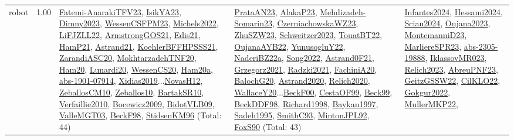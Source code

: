 {\begin{longtable}{p{3cm}r>{\raggedright\arraybackslash}p{6cm}>{\raggedright\arraybackslash}p{6cm}>{\raggedright\arraybackslash}p{8cm}}
\index{robot}\index{ApplicationAreas!robot}robot &  1.00 & \hyperref[detail:Fatemi-AnarakiTFV23]{Fatemi-AnarakiTFV23}, \hyperref[detail:IsikYA23]{IsikYA23}, \hyperref[detail:Dimny2023]{Dimny2023}, \hyperref[detail:WessenCSFPM23]{WessenCSFPM23}, \hyperref[detail:Michels2022]{Michels2022}, \hyperref[detail:LiFJZLL22]{LiFJZLL22}, \hyperref[detail:ArmstrongGOS21]{ArmstrongGOS21}, \hyperref[detail:Edis21]{Edis21}, \hyperref[detail:HamP21]{HamP21}, \hyperref[detail:Astrand21]{Astrand21}, \hyperref[detail:KoehlerBFFHPSSS21]{KoehlerBFFHPSSS21}, \hyperref[detail:ZarandiASC20]{ZarandiASC20}, \hyperref[detail:MokhtarzadehTNF20]{MokhtarzadehTNF20}, \hyperref[detail:Ham20]{Ham20}, \hyperref[detail:Lunardi20]{Lunardi20}, \hyperref[detail:WessenCS20]{WessenCS20}, \hyperref[detail:Ham20a]{Ham20a}, \hyperref[detail:abs-1901-07914]{abs-1901-07914}, \hyperref[detail:Xidias2019]{Xidias2019}...\hyperref[detail:NovasH12]{NovasH12}, \hyperref[detail:ZeballosCM10]{ZeballosCM10}, \hyperref[detail:Zeballos10]{Zeballos10}, \hyperref[detail:BartakSR10]{BartakSR10}, \hyperref[detail:Verfaillie2010]{Verfaillie2010}, \hyperref[detail:Bocewicz2009]{Bocewicz2009}, \hyperref[detail:BidotVLB09]{BidotVLB09}, \hyperref[detail:ValleMGT03]{ValleMGT03}, \hyperref[detail:BeckF98]{BeckF98}, \hyperref[detail:StidsenKM96]{StidsenKM96} (Total: 44) & \hyperref[detail:PrataAN23]{PrataAN23}, \hyperref[detail:AlakaP23]{AlakaP23}, \hyperref[detail:Mehdizadeh-Somarin23]{Mehdizadeh-Somarin23}, \hyperref[detail:CzerniachowskaWZ23]{CzerniachowskaWZ23}, \hyperref[detail:ZhuSZW23]{ZhuSZW23}, \hyperref[detail:Schweitzer2023]{Schweitzer2023}, \hyperref[detail:TouatBT22]{TouatBT22}, \hyperref[detail:OujanaAYB22]{OujanaAYB22}, \hyperref[detail:YunusogluY22]{YunusogluY22}, \hyperref[detail:NaderiBZ22a]{NaderiBZ22a}, \hyperref[detail:Song2022]{Song2022}, \hyperref[detail:Astrand0F21]{Astrand0F21}, \hyperref[detail:Grzegorz2021]{Grzegorz2021}, \hyperref[detail:Radzki2021]{Radzki2021}, \hyperref[detail:FachiniA20]{FachiniA20}, \hyperref[detail:BalochG20]{BalochG20}, \hyperref[detail:Astrand2020]{Astrand2020}, \hyperref[detail:Relich2020]{Relich2020}, \hyperref[detail:WallaceY20]{WallaceY20}...\hyperref[detail:BeckF00]{BeckF00}, \hyperref[detail:CestaOF99]{CestaOF99}, \hyperref[detail:Beck99]{Beck99}, \hyperref[detail:BeckDDF98]{BeckDDF98}, \hyperref[detail:Richard1998]{Richard1998}, \hyperref[detail:Baykan1997]{Baykan1997}, \hyperref[detail:Sadeh1995]{Sadeh1995}, \hyperref[detail:SmithC93]{SmithC93}, \hyperref[detail:MintonJPL92]{MintonJPL92}, \hyperref[detail:FoxS90]{FoxS90} (Total: 43) & \hyperref[detail:Infantes2024]{Infantes2024}, \hyperref[detail:Hessami2024]{Hessami2024}, \hyperref[detail:Sciau2024]{Sciau2024}, \hyperref[detail:Oujana2023]{Oujana2023}, \hyperref[detail:MontemanniD23]{MontemanniD23}, \hyperref[detail:MarliereSPR23]{MarliereSPR23}, \hyperref[detail:abs-2305-19888]{abs-2305-19888}, \hyperref[detail:IklassovMR023]{IklassovMR023}, \hyperref[detail:Relich2023]{Relich2023}, \hyperref[detail:AbreuPNF23]{AbreuPNF23}, \hyperref[detail:GeitzGSSW22]{GeitzGSSW22}, \hyperref[detail:CilKLO22]{CilKLO22}, \hyperref[detail:Gokgur2022]{Gokgur2022}, \hyperref[detail:MullerMKP22]{MullerMKP22}, 
\end{longtable}}
